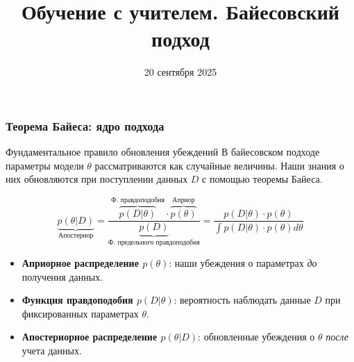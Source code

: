 \documentclass[notheorems, handout]{beamer}
\title[Статистическое и машинное обучение]{Обучение с учителем.
Байесовский подход}
\institute[Санкт-Петербургский Государственный Университет]{%
  \small
  Санкт-Петербургский государственный университет\\
  Кафедра статистического моделирования
}
\date{20 сентября 2025}
\begin{document}
\begin{frame}
  \titlepage
\end{frame}

\begin{frame}
  \frametitle{Теорема Байеса: ядро подхода}
  \begin{block}{Фундаментальное правило обновления убеждений}
    В байесовском подходе параметры модели $\theta$ рассматриваются
    как случайные величины. Наши знания о них обновляются при
    поступлении данных $D$ с помощью теоремы Байеса.
  \end{block}
  \begin{equation*}
    \underbrace{p(\theta | D)}_{\text{Апостериор}} =
    \frac{\overbrace{p(D | \theta)}^{\text{Ф. правдоподобия}} \cdot
    \overbrace{p(\theta)}^{\text{Априор}}}{\underbrace{p(D)}_{\text{Ф.
    предельного правдоподобия}}} = \frac{p(D | \theta) \cdot
    p(\theta)}{\int{p(D | \theta) \cdot p(\theta) d\theta}}
  \end{equation*}
  \begin{itemize}
    \item \textbf{Априорное распределение $p(\theta)$}: наши
      убеждения о параметрах \textit{до} получения данных.
    \item \textbf{Функция правдоподобия $p(D | \theta)$}: вероятность
      наблюдать данные $D$ при фиксированных параметрах $\theta$.
    \item \textbf{Апостериорное распределение $p(\theta | D)$}:
      обновленные убеждения о $\theta$ \textit{после} учета данных.
  \end{itemize}
\end{frame}
\end{document}
